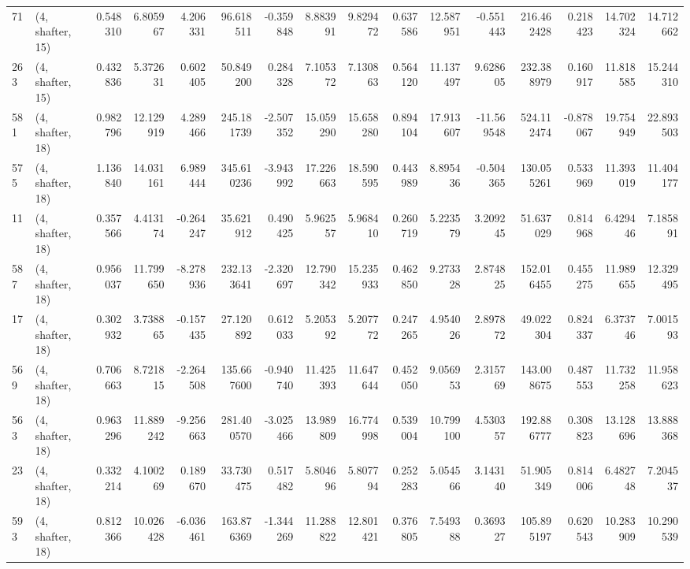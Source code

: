\begin{tabular}{llrrrrrrrrrrrrrr}
71  &  (4, shafter, 15) &   0.548310 &   6.805967 &   4.206331 &    96.618511 &  -0.359848 &   8.883991 &   9.829472 &  0.637586 &  12.587951 &  -0.551443 &    216.462428 &   0.218423 &   14.702324 &   14.712662 \\
263 &  (4, shafter, 15) &   0.432836 &   5.372631 &   0.602405 &    50.849200 &   0.284328 &   7.105372 &   7.130863 &  0.564120 &  11.137497 &   9.628605 &    232.388979 &   0.160917 &   11.818585 &   15.244310 \\
581 &  (4, shafter, 18) &   0.982796 &  12.129919 &   4.289466 &   245.181739 &  -2.507352 &  15.059290 &  15.658280 &  0.894104 &  17.913607 & -11.569548 &    524.112474 &  -0.878067 &   19.754949 &   22.893503 \\
575 &  (4, shafter, 18) &   1.136840 &  14.031161 &   6.989444 &   345.610236 &  -3.943992 &  17.226663 &  18.590595 &  0.443989 &   8.895436 &  -0.504365 &    130.055261 &   0.533969 &   11.393019 &   11.404177 \\
11  &  (4, shafter, 18) &   0.357566 &   4.413174 &  -0.264247 &    35.621912 &   0.490425 &   5.962557 &   5.968410 &  0.260719 &   5.223579 &   3.209245 &     51.637029 &   0.814968 &    6.429446 &    7.185891 \\
587 &  (4, shafter, 18) &   0.956037 &  11.799650 &  -8.278936 &   232.133641 &  -2.320697 &  12.790342 &  15.235933 &  0.462850 &   9.273328 &   2.874825 &    152.016455 &   0.455275 &   11.989655 &   12.329495 \\
17  &  (4, shafter, 18) &   0.302932 &   3.738865 &  -0.157435 &    27.120892 &   0.612033 &   5.205392 &   5.207772 &  0.247265 &   4.954026 &   2.897872 &     49.022304 &   0.824337 &    6.373746 &    7.001593 \\
569 &  (4, shafter, 18) &   0.706663 &   8.721815 &  -2.264508 &   135.667600 &  -0.940740 &  11.425393 &  11.647644 &  0.452050 &   9.056953 &   2.315769 &    143.008675 &   0.487553 &   11.732258 &   11.958623 \\
563 &  (4, shafter, 18) &   0.963296 &  11.889242 &  -9.256663 &   281.400570 &  -3.025466 &  13.989809 &  16.774998 &  0.539004 &  10.799100 &   4.530357 &    192.886777 &   0.308823 &   13.128696 &   13.888368 \\
23  &  (4, shafter, 18) &   0.332214 &   4.100269 &   0.189670 &    33.730475 &   0.517482 &   5.804696 &   5.807794 &  0.252283 &   5.054566 &   3.143140 &     51.905349 &   0.814006 &    6.482748 &    7.204537 \\
593 &  (4, shafter, 18) &   0.812366 &  10.026428 &  -6.036461 &   163.876369 &  -1.344269 &  11.288822 &  12.801421 &  0.376805 &   7.549388 &   0.369327 &    105.895197 &   0.620543 &   10.283909 &   10.290539 \\

\end{tabular}
